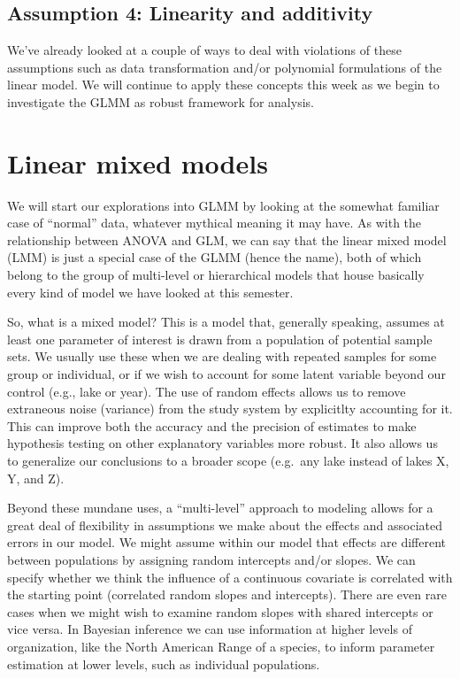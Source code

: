 \documentclass[
]{book}
\begin{document}
\hypertarget{linearity-14}{%
\subsection{Assumption 4: Linearity and additivity}\label{linearity-14}}

We've already looked at a couple of ways to deal with violations of these assumptions such as data transformation and/or polynomial formulations of the linear model. We will continue to apply these concepts this week as we begin to investigate the GLMM as robust framework for analysis.

\hypertarget{linear-mixed-models}{%
\section{Linear mixed models}\label{linear-mixed-models}}

We will start our explorations into GLMM by looking at the somewhat familiar case of ``normal'' data, whatever mythical meaning it may have. As with the relationship between ANOVA and GLM, we can say that the linear mixed model (LMM) is just a special case of the GLMM (hence the name), both of which belong to the group of multi-level or hierarchical models that house basically every kind of model we have looked at this semester.

So, what is a mixed model? This is a model that, generally speaking, assumes at least one parameter of interest is drawn from a population of potential sample sets. We usually use these when we are dealing with repeated samples for some group or individual, or if we wish to account for some latent variable beyond our control (e.g., lake or year). The use of random effects allows us to remove extraneous noise (variance) from the study system by explicitlty accounting for it. This can improve both the accuracy and the precision of estimates to make hypothesis testing on other explanatory variables more robust. It also allows us to generalize our conclusions to a broader scope (e.g.~any lake instead of lakes X, Y, and Z).

Beyond these mundane uses, a ``multi-level'' approach to modeling allows for a great deal of flexibility in assumptions we make about the effects and associated errors in our model. We might assume within our model that effects are different between populations by assigning random intercepts and/or slopes. We can specify whether we think the influence of a continuous covariate is correlated with the starting point (correlated random slopes and intercepts). There are even rare cases when we might wish to examine random slopes with shared intercepts or vice versa. In Bayesian inference we can use information at higher levels of organization, like the North American Range of a species, to inform parameter estimation at lower levels, such as individual populations.
\end{document}
